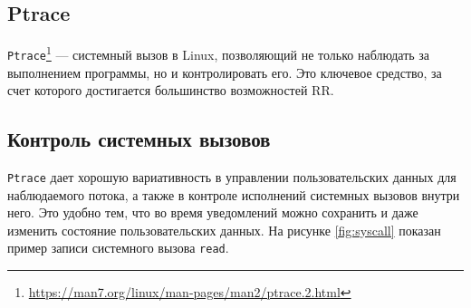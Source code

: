 
\subsection{Ptrace}

\texttt{Ptrace}\footnote{\url{https://man7.org/linux/man-pages/man2/ptrace.2.html}} — системный вызов в Linux, позволяющий не только наблюдать за выполнением программы, 
но и контролировать его. Это ключевое средство, за счет которого 
достигается большинство возможностей RR.

\subsection{Контроль системных вызовов}

\texttt{Ptrace} дает хорошую вариативность в 
управлении пользовательских данных для наблюдаемого потока, 
а также в контроле исполнений системных вызовов внутри него. 
Это удобно тем, что во время уведомлений можно сохранить и даже изменить состояние пользовательских данных. 
На рисунке \ref{fig:syscall} показан пример записи системного вызова \texttt{read}.

